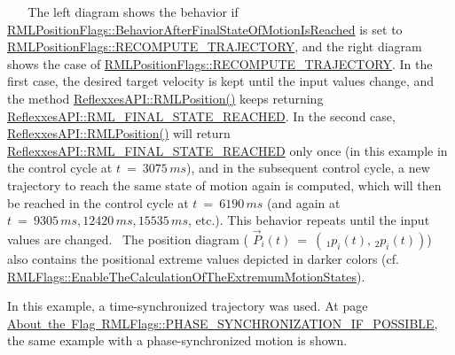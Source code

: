 ~\newline
~\newline
 The left diagram shows the behavior if {\ttfamily \mbox{\hyperlink{classRMLPositionFlags_a85a2739dcace743bf56c81946036d504}{R\+M\+L\+Position\+Flags\+::\+Behavior\+After\+Final\+State\+Of\+Motion\+Is\+Reached}}} is set to {\ttfamily \mbox{\hyperlink{classRMLPositionFlags_a0cf5bb7ba9fb4d9ab8040b0546170761a1aef826d31747b8d4e1f89c024fb36ae}{R\+M\+L\+Position\+Flags\+::\+R\+E\+C\+O\+M\+P\+U\+T\+E\+\_\+\+T\+R\+A\+J\+E\+C\+T\+O\+RY}}}, and the right diagram shows the case of {\ttfamily \mbox{\hyperlink{classRMLPositionFlags_a0cf5bb7ba9fb4d9ab8040b0546170761a1aef826d31747b8d4e1f89c024fb36ae}{R\+M\+L\+Position\+Flags\+::\+R\+E\+C\+O\+M\+P\+U\+T\+E\+\_\+\+T\+R\+A\+J\+E\+C\+T\+O\+RY}}}. In the first case, the desired target velocity is kept until the input values change, and the method \mbox{\hyperlink{classReflexxesAPI_a30d3cdba072553a5d53aa4ce4b4a77d1}{Reflexxes\+A\+P\+I\+::\+R\+M\+L\+Position()}} keeps returning {\ttfamily \mbox{\hyperlink{classReflexxesAPI_a9bf1fa242f1f7005850cd3f517ea8f59a5108326a7898a342063eb558c5614958}{Reflexxes\+A\+P\+I\+::\+R\+M\+L\+\_\+\+F\+I\+N\+A\+L\+\_\+\+S\+T\+A\+T\+E\+\_\+\+R\+E\+A\+C\+H\+ED}}}. In the second case, \mbox{\hyperlink{classReflexxesAPI_a30d3cdba072553a5d53aa4ce4b4a77d1}{Reflexxes\+A\+P\+I\+::\+R\+M\+L\+Position()}} will return {\ttfamily \mbox{\hyperlink{classReflexxesAPI_a9bf1fa242f1f7005850cd3f517ea8f59a5108326a7898a342063eb558c5614958}{Reflexxes\+A\+P\+I\+::\+R\+M\+L\+\_\+\+F\+I\+N\+A\+L\+\_\+\+S\+T\+A\+T\+E\+\_\+\+R\+E\+A\+C\+H\+ED}}} only once (in this example in the control cycle at $ t\ =\ 3075\,ms$), and in the subsequent control cycle, a new trajectory to reach the same state of motion again is computed, which will then be reached in the control cycle at $ t\ =\ 6190\,ms$ (and again at $ t\ =\ 9305\,ms, 12420\,ms, 15535\,ms$, etc.). This behavior repeats until the input values are changed.~\newline
 The position diagram ( $ \vec{P}_i(t)\ =\ \left(\,\!_1p_i(t),\,_2p_i(t)\right) $) also contains the positional extreme values depicted in darker colors (cf. \mbox{\hyperlink{classRMLFlags_a5f2076c59d030993ee522b99873a41cb}{R\+M\+L\+Flags\+::\+Enable\+The\+Calculation\+Of\+The\+Extremum\+Motion\+States}}).~\newline


In this example, a time-\/synchronized trajectory was used. At page \mbox{\hyperlink{page_PSIfPossible}{About the Flag R\+M\+L\+Flags\+::\+P\+H\+A\+S\+E\+\_\+\+S\+Y\+N\+C\+H\+R\+O\+N\+I\+Z\+A\+T\+I\+O\+N\+\_\+\+I\+F\+\_\+\+P\+O\+S\+S\+I\+B\+LE}}, the same example with a phase-\/synchronized motion is shown. ~\newline
~\newline


